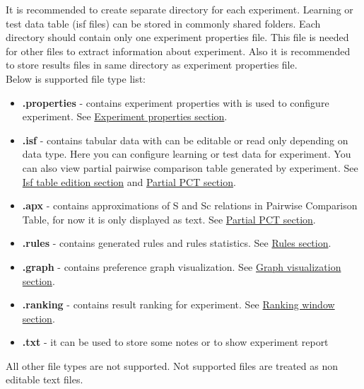 It is recommended to create separate directory for each experiment. Learning or test data table (isf files) can be stored in commonly shared folders. Each directory should contain only one experiment properties file. This file is needed for other files to extract information about experiment. Also it is recommended to store results files in same directory as experiment properties file.\\

Below is supported file type list:
\begin{itemize}
	\item \textbf{.properties} - contains experiment properties with is used to configure experiment. See \hyperref[section:properties]{Experiment properties section}.
	\item \textbf{.isf} - contains tabular data with can be editable or read only depending on data type. Here you can configure learning or test data for experiment. You can also view partial pairwise comparison table generated by experiment.
	See \hyperref[section:isf-table]{Isf table edition section} and  \hyperref[sub:pct-isf]{Partial PCT section}.
	\item \textbf{.apx} - contains approximations of S and Sc relations in Pairwise Comparison Table, for now it is only displayed as text.
	See \hyperref[sub:pct-apx]{Partial PCT section}.
	\item \textbf{.rules} - contains generated rules and rules statistics.
	See \hyperref[section:rules]{Rules section}.
	\item \textbf{.graph} - contains preference graph visualization.
	See \hyperref[section:graph]{Graph visualization section}.
	\item \textbf{.ranking} - contains result ranking for experiment.
	See \hyperref[section:ranking]{Ranking window section}.
	\item \textbf{.txt} - it can be used to store some notes or to show experiment report
\end{itemize}

All other file types are not supported. Not supported files are treated as non editable text files.

\vfill\newpage